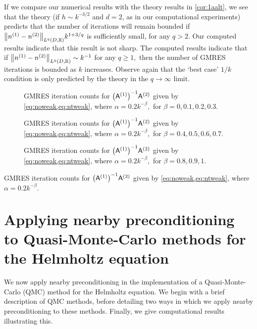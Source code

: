 If we compare our numerical results with the theory results in \cref{cor:1aalt}, we see that the theory (if $h \sim k^{-3/2}$ and $d=2$, as in our computational experiments) predicts that the number of iterations will remain bounded if $\NLqDRR{\nso-\nst} k^{1+3/q}$ is sufficiently small, for any $q > 2.$ Our computed results indicate that this result is not sharp. The computed results indicate that if $\NLqDRR{\nso-\nst} \sim k^{-1}$ for any $q \geq 1,$ then the number of GMRES iterations is bounded as $k$ increases. Observe again that the `best case' $1/k$ condition is only predicted by the theory in the $q\rightarrow \infty$ limit.

\begin{figure}

  \caption{GMRES iteration counts for $\AmatoI\Amatt$ given by \cref{eq:noweak,eq:ntweak}, where $\alpha = 0.2k^{-\beta},$ for $\beta = 0,0.1,0.2,0.3.$}\label{fig:l1low}
\end{figure}

\begin{figure}
  
    \caption{GMRES iteration counts for $\AmatoI\Amatt$ given by \cref{eq:noweak,eq:ntweak}, where $\alpha = 0.2k^{-\beta},$ for $\beta = 0.4,0.5,0.6,0.7.$}\label{fig:l1med}
\end{figure}
    
    \begin{figure}
    
      \caption{GMRES iteration counts for $\AmatoI\Amatt$ given by \cref{eq:noweak,eq:ntweak}, where $\alpha = 0.2k^{-\beta},$ for $\beta = 0.8,0.9,1.$}\label{fig:l1high}
\end{figure}

\begin{table}
  \centering
  
  \caption{GMRES iteration counts for $\AmatoI\Amatt$ given by \cref{eq:noweak,eq:ntweak}, where $\alpha = 0.2k^{-\beta}.$}\label{tab:l1}
  \end{table}



\section{Applying nearby preconditioning to Quasi-Monte-Carlo methods for the Helmholtz equation}\label{sec:nbpcqmc}

We now apply nearby preconditioning in the implementation of a Quasi-Monte-Carlo (QMC) method for the Helmholtz equation. We begin with a brief description of QMC methods, before detailing two ways in which we apply nearby preconditioning to these methods. Finally, we give computational results illustrating this.

